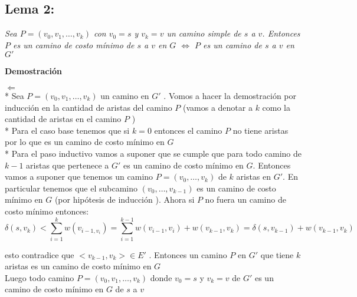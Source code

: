 \documentclass{article}
\begin{document}
    \subsection*{Lema 2:}
        
    \noindent \textit{Sea $P = \left(v_0,v_1,\dots , v_k \right)$ con $v_0 = s$ y $v_k = v$ un camino simple de $s$ a $v$. Entonces $P$ es un 
            camino de costo m\'inimo de $s$ a $v$  en $G$ $\Longleftrightarrow$  $P$ es un camino de $s$ a $v$ en $G'$}
    
    
    \vspace{0.3cm}
    \noindent \textbf{Demostraci\'on} 
    
    \noindent $ \Longleftarrow $
    \\*
    Sea $P = \left(v_0,v_1,\dots , v_k \right)$  un camino en $G'$ . 
    Vomos a hacer la demostraci\'on por inducci\'on en la cantidad de aristas del camino $P$ (vamos a denotar a $k$ como la cantidad de aristas en el camino $P$ )
    \\*
    Para el caso base tenemos que si $k=0$ entonces el camino $P$ no tiene aristas por lo que es un camino de costo m\'inimo en $G$ 
    \\*
    Para el paso inductivo vamos a suponer que se cumple que para todo camino de $k-1$ aristas que pertenece a  $G'$ es un camino de costo m\'inimo en $G$. 
    Entonces vamos a suponer que tenemos un camino $P = \left(v_{0},\dots,v_{k}\right)$  de $k$ aristas en $G'$. En particular tenemos que el subcamino $\left(v_0,\dots,v_{k-1}\right)$ es un camino de 
    costo m\'inimo en $G$ (por hip\'otesis de inducci\'on ). Ahora si $P$ no fuera un camino de costo m\'inimo entonces: 
    \begin{equation*}
        \delta \left(s,v_k\right) < \sum_{i=1}^{k} w\left(v_{i-1,v_i}\right) = \sum_{i=1}^{k-1} w\left(v_{i-1}, v_{i}\right) + w\left(v_{k-1}, v_{k}\right)  = \delta\left(s,v_{k-1}\right) + w\left(v_{k-1}, v_{k}\right)
    \end{equation*}

    \noindent esto contradice que $<v_{k-1}, v_{k}> \in E'$ . Entonces un camino $P$  en $G'$ que tiene $k$ aristas es un camino de costo m\'inimo en $G$ 
    \\
    Luego todo camino $P = \left(v_0,v_1,\dots , v_k \right)$ donde $v_{0}=s$ y $v_{k}=v$ de $G'$ es un camino  de costo m\'inimo en $G$ de $s$ a $v$ 
    
    \vspace*{0.5cm} 
\end{document}
